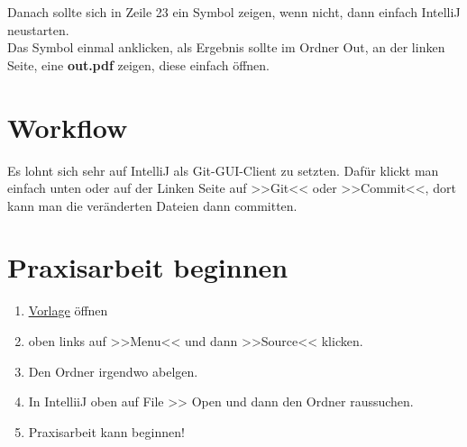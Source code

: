 \documentclass[11pt]{article}
\begin{document}
    Danach sollte sich in Zeile 23 ein Symbol zeigen, wenn nicht, dann einfach IntelliJ neustarten. \\

    Das Symbol einmal anklicken, als Ergebnis sollte im Ordner Out, an der linken Seite, eine \textbf{out.pdf} zeigen, diese einfach öffnen.


    \section{Workflow}\label{sec:workflow}

    Es lohnt sich sehr auf IntelliJ als Git-GUI-Client zu setzten.
    Dafür klickt man einfach unten oder auf der Linken Seite auf >>Git<< oder >>Commit<<, dort kann man die veränderten Dateien dann committen.

    \section{Praxisarbeit beginnen}\label{sec:praxisarbeit-beginnen}

    \begin{enumerate}
        \item \href{https://www.overleaf.com/read/yrndghycwxgb}{\underline{Vorlage}} öffnen
        \item oben links auf >>Menu<< und dann >>Source<< klicken.
        \item Den Ordner irgendwo abelgen.
        \item  In IntelliiJ oben auf File >> Open und dann den Ordner raussuchen. \\
        \item Praxisarbeit kann beginnen!
    \end{enumerate}
\end{document}
